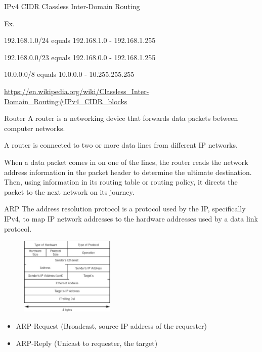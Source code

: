 \documentclass[UTF8]{ctexbeamer}
\begin{document}
\begin{frame}{IPv4 CIDR}
    Classless Inter-Domain Routing
    
    Ex.
    
    192.168.1.0/24 equals 192.168.1.0 - 192.168.1.255
    
    192.168.0.0/23 equals 192.168.0.0 - 192.168.1.255
    
    10.0.0.0/8 equals 10.0.0.0 - 10.255.255.255
    
    \url{https://en.wikipedia.org/wiki/Classless\_Inter-Domain\_Routing\#IPv4\_CIDR\_blocks}
\end{frame}

\begin{frame}{Router}
    A router is a networking device that forwards data packets between computer networks.
    
    \vspace{5mm}
    
    A router is connected to two or more data lines from different IP networks.
    
    \vspace{2mm}
    
    When a data packet comes in on one of the lines, the router reads the network address information in the packet header to determine the ultimate destination. Then, using information in its routing table or routing policy, it directs the packet to the next network on its journey.
\end{frame}

\begin{frame}{ARP\footnotemark}
    The address resolution protocol is a protocol used by the IP, specifically IPv4, to map IP network addresses to the hardware addresses used by a data link protocol.
    \begin{figure}
        \centering
        \includegraphics[width=0.4\textwidth]{arp.jpg}
    \end{figure}
    \begin{itemize}
        \item ARP-Request (Broadcast, source IP address of the requester)
        \item ARP-Reply (Unicast to requester, the target)
    \end{itemize}
\end{frame}
\end{document}
